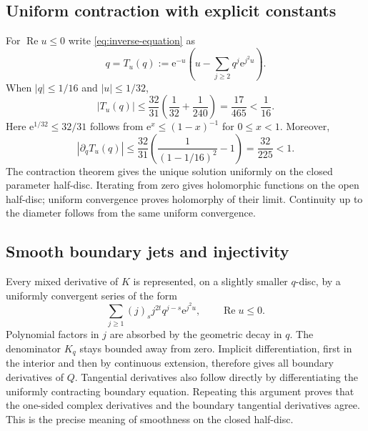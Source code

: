 \documentclass[11pt,a4paper]{article}
\numberwithin{equation}{section}
\theoremstyle{definition}
\theoremstyle{remark}
\newcommand{\ee}{\mathrm e}
\newcommand{\Ree}{\operatorname{Re}}
\begin{document}
\subsection{Uniform contraction with explicit constants}
For $\Ree u\le0$ write \eqref{eq:inverse-equation} as
\begin{equation}
 q=T_u(q):=\ee^{-u}
       \left(u-\sum_{j\ge2}q^j\ee^{j^2u}\right).
 \label{eq:contraction}
\end{equation}
When $|q|\le1/16$ and $|u|\le1/32$,
\[
 |T_u(q)|\le\frac{32}{31}
       \left(\frac1{32}+\frac1{240}\right)
       =\frac{17}{465}<\frac1{16}.
\]
Here $\ee^{1/32}\le32/31$ follows from
$\ee^x\le(1-x)^{-1}$ for $0\le x<1$.
Moreover,
\begin{equation}
 |\partial_qT_u(q)|
  \le\frac{32}{31}
       \left(\frac1{(1-1/16)^2}-1\right)
  =\frac{32}{225}<1.
 \label{eq:contraction-constant}
\end{equation}
The contraction theorem gives the unique solution uniformly on the
closed parameter half-disc.  Iterating from zero gives holomorphic
functions on the open half-disc; uniform convergence proves holomorphy
of their limit.  Continuity up to the diameter follows from the same
uniform convergence.

\subsection{Smooth boundary jets and injectivity}
Every mixed derivative of $K$ is represented, on a slightly smaller
$q$-disc, by a uniformly convergent series of the form
\[
 \sum_{j\ge1}(j)_s j^{2t} q^{j-s}\ee^{j^2u},
 \qquad \Ree u\le0.
\]
Polynomial factors in $j$ are absorbed by the geometric decay in $q$.
The denominator $K_q$ stays bounded away from zero.  Implicit
differentiation, first in the interior and then by continuous extension,
therefore gives all boundary derivatives of $Q$.  Tangential derivatives
also follow directly by differentiating the uniformly contracting
boundary equation.  Repeating this argument proves that the one-sided
complex derivatives and the boundary tangential derivatives agree.
This is the precise meaning of smoothness on the closed half-disc.
\end{document}
